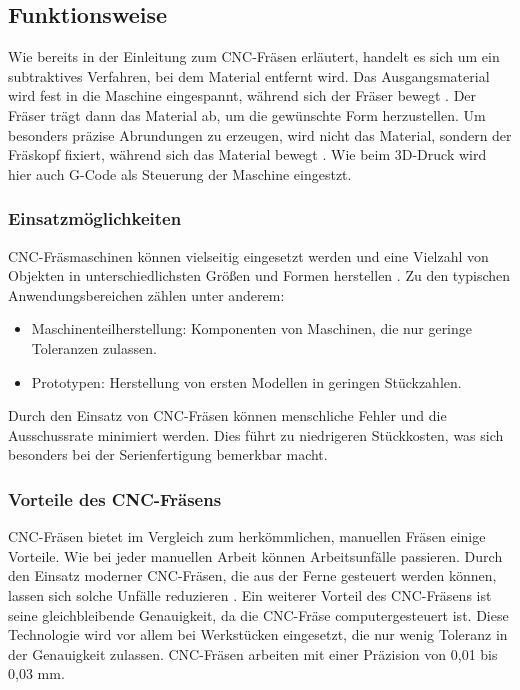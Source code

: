 \subsection{Funktionsweise}
Wie bereits in der Einleitung zum CNC-Fräsen erläutert, handelt es sich um ein subtraktives Verfahren, bei dem Material entfernt wird. Das Ausgangsmaterial wird fest in die Maschine eingespannt, während sich der Fräser bewegt \parencite{CNCFraesen2}. Der Fräser trägt dann das Material ab, um die gewünschte Form herzustellen. Um besonders präzise Abrundungen zu erzeugen, wird nicht das Material, sondern der Fräskopf fixiert, während sich das Material bewegt  \parencite{CNCFraesen3}. Wie beim 3D-Druck wird hier auch G-Code als Steuerung der Maschine eingestzt. \\



\subsubsection{Einsatzmöglichkeiten}
CNC-Fräsmaschinen können vielseitig eingesetzt werden und eine Vielzahl von Objekten in unterschiedlichsten Größen und Formen herstellen  \parencite{CNCFraesen2}. Zu den typischen Anwendungsbereichen zählen unter anderem:

\begin{itemize}
	\item Maschinenteilherstellung: Komponenten von Maschinen, die nur geringe Toleranzen zulassen.
	\item Prototypen: Herstellung von ersten Modellen in geringen Stückzahlen.
\end{itemize}

Durch den Einsatz von CNC-Fräsen können menschliche Fehler und die Ausschussrate minimiert werden. Dies führt zu niedrigeren Stückkosten, was sich besonders bei der Serienfertigung bemerkbar macht.\\  \parencite{CNCFraesen3}


\subsubsection{Vorteile des CNC-Fräsens}
CNC-Fräsen bietet im Vergleich zum herkömmlichen, manuellen Fräsen einige Vorteile. Wie bei jeder manuellen Arbeit können Arbeitsunfälle passieren. Durch den Einsatz moderner CNC-Fräsen, die aus der Ferne gesteuert werden können, lassen sich solche Unfälle reduzieren \parencite{CNCFraesenVorteile}. Ein weiterer Vorteil des CNC-Fräsens ist seine gleichbleibende Genauigkeit, da die CNC-Fräse computergesteuert ist. Diese Technologie wird vor allem bei Werkstücken eingesetzt, die nur wenig Toleranz in der Genauigkeit zulassen. CNC-Fräsen arbeiten mit einer Präzision von 0,01 bis 0,03 mm. \\


